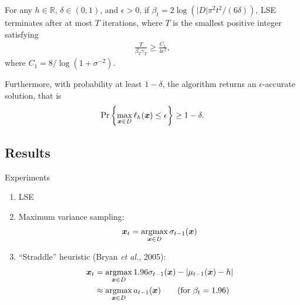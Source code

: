 \documentclass[10pt,mathserif,serif,handout]{beamer}
\newcommand{\acl}{\textsf{LSE}\xspace}
\begin{document}
\begin{frame}
\end{frame}

\begin{frame}
\begin{theorem}[Convergence of \acl]
\label{thm:acl}
For any $h\in\mathbb{R}$, $\delta \in (0, 1)$, and $\epsilon > 0$,
if $\beta_t = 2\log(|D|\pi^2 t^2/(6\delta))$, \acl terminates after
at most $T$ iterations, where $T$ is the smallest positive integer
satisfying
\begin{align*}
\frac{T}{\beta_T \gamma_T} \geq \frac{C_1}{4\epsilon^2},
\end{align*}
where $C_1 = 8 / \log(1 + \sigma^{-2})$.

Furthermore, with probability at least $1-\delta$, the algorithm returns
an $\epsilon$-accurate solution, that is
\begin{align*}
\Pr\left\{\max_{\bm{x}\in D}\ell_h(\bm{x}) \leq \epsilon\right\} \geq 1 - \delta.
\end{align*}
\end{theorem}
\end{frame}

\subsection*{Results}
\begin{frame}
\begin{center}
{\large Experiments}
\end{center}
\begin{enumerate}
\item \acl
\item<2-> Maximum variance sampling:
\vspace{-0.5em}
\begin{align*}
\*x_t = \argmax_{\*x\in D} \sigma_{t-1}(\*x)
\end{align*}
\item<3-> ``Straddle'' heuristic (Bryan \emph{et al.}, 2005):
\vspace{-0.5em}
\begin{align*}
\*x_t &= \argmax_{\*x\in D} 1.96\sigma_{t-1}(\*x)-|\mu_{t-1}(\*x) - h|\\
&\approx \argmax_{\*x\in D} a_{t-1}(\*x) \tag{for $\beta_t = 1.96$}
\end{align*}
\end{enumerate}
\end{frame}
\end{document}
